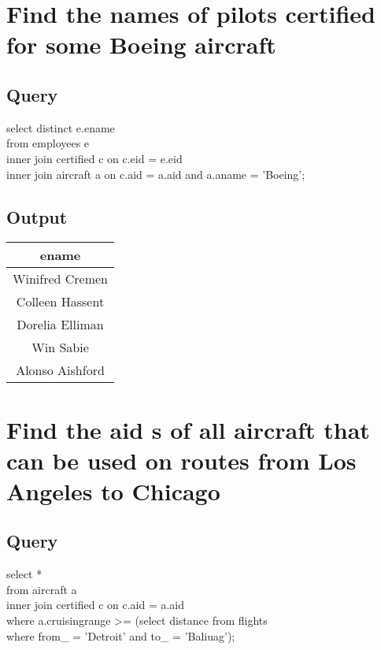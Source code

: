 \documentclass[11pt]{scrartcl} %
\begin{document}




\section{Find the names of pilots certified for some Boeing aircraft }

\subsection{Query}
select distinct e.ename\\
from employees e \\
inner join certified c on c.eid = e.eid\\
inner join aircraft a on c.aid = a.aid and a.aname = 'Boeing';

\subsection{Output}
\begin{left}
\begin{tabular}{ | c | }
\hline
\textbf{ename} \\
\hline
Winifred Cremen\\
Colleen Hassent\\
Dorelia Elliman\\
Win Sabie\\
Alonso Aishford\\

\hline

\end{tabular}
\end{left}




\section{Find the aid s of all aircraft that can be used on routes from Los Angeles to Chicago }

\subsection{Query}
select  *\\
from aircraft a\\
inner join certified c on c.aid = a.aid\\
where a.cruisingrange >= (select distance from flights \\
\hspace*{30pt}where from\_ = 'Detroit' and to\_ = 'Baliuag');
\end{document}
